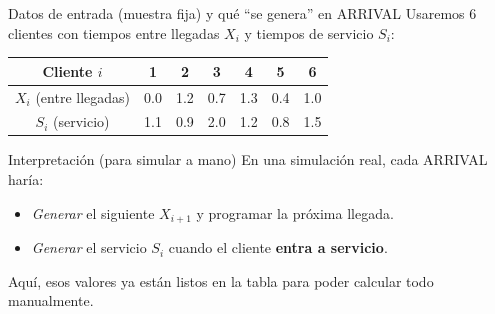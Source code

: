 \documentclass[aspectratio=1610, 9pt]{beamer}
\begin{document}
\begin{frame}{Datos de entrada (muestra fija) y qué “se genera” en ARRIVAL}
\small
Usaremos 6 clientes con tiempos entre llegadas $X_i$ y tiempos de servicio $S_i$:

\setlength{\tabcolsep}{5pt}
\renewcommand{\arraystretch}{1.18}
\begin{table}
\centering
\scriptsize
\begin{tabular}{@{}ccccccc@{}}
\toprule
Cliente $i$ & 1 & 2 & 3 & 4 & 5 & 6\\
\midrule
$X_i$ (entre llegadas) & 0.0 & 1.2 & 0.7 & 1.3 & 0.4 & 1.0\\
$S_i$ (servicio)       & 1.1 & 0.9 & 2.0 & 1.2 & 0.8 & 1.5\\
\bottomrule
\end{tabular}
\end{table}

\vspace{2pt}
\begin{block}{Interpretación (para simular a mano)}
En una simulación real, cada ARRIVAL haría:
\begin{itemize}
\item \emph{Generar} el siguiente $X_{i+1}$ y programar la próxima llegada.
\item \emph{Generar} el servicio $S_i$ cuando el cliente \textbf{entra a servicio}.
\end{itemize}
Aquí, esos valores ya están listos en la tabla para poder calcular todo manualmente.
\end{block}
\end{frame}
\end{document}
